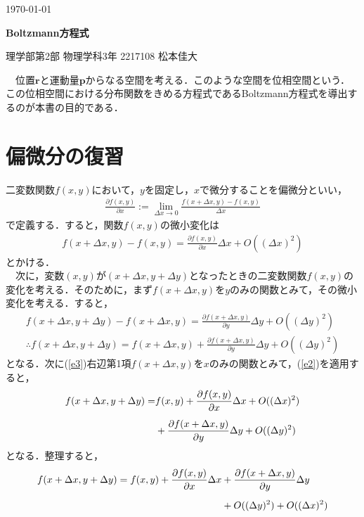 \documentclass[12pt]{jsarticle}\usepackage{ifthen}\newboolean{enlarge}\setboolean{enlarge}{false}
\newcommand{\vr}{{\bm{r}}} %
\newcommand{\vp}{{\bm{p}}} %
\begin{document}
\begin{flushright}
\footnotesize
\today
\end{flushright}
\noindent
{\bf
\Large Boltzmann方程式}
\begin{flushright}
理学部第2部 物理学科3年 2217108 松本佳大

\end{flushright}
　位置$\vr$と運動量$\vp$からなる空間を考える．このような空間を位相空間という．この位相空間における分布関数をきめる方程式であるBoltzmann方程式を導出するのが本書の目的である．






\section{偏微分の復習}
二変数関数$f(x,y)$において，$y$を固定し，$x$で微分することを偏微分といい，
\begin{align}
\label{e1}
\frac{\partial f(x,y)}{\partial x}:=\lim_{\Delta x\to 0}\frac{f(x+\Delta x,y)-f(x,y)}{\Delta x}
\end{align}
で定義する．すると，関数$f(x,y)$の微小変化は
\begin{align}
\label{e2}
f(x+\Delta x,y)-f(x,y)=\frac{\partial f(x,y)}{\partial x}\Delta x+O((\Delta x)^2)
\end{align}
とかける．\\
　次に，変数$(x,y)$が$(x+\Delta x,y+\Delta y)$となったときの二変数関数$f(x,y)$の変化を考える．そのために，まず$f(x+\Delta x,y)$を$y$のみの関数とみて，その微小変化を考える．すると，
\begin{align}
f(x+\Delta x,y+\Delta y)-f(x+\Delta x,y)=\frac{\partial f(x+\Delta x,y)}{\partial y}\Delta y+O((\Delta y)^2)\\[5pt]
\label{e3}
\therefore
f(x+\Delta x,y+\Delta y)=f(x+\Delta x,y)+\frac{\partial f(x+\Delta x,y)}{\partial y}\Delta y+O((\Delta y)^2)
\end{align}
となる．次に(\ref{e3})右辺第1項$f(x+\Delta x,y)$を$x$のみの関数とみて，(\ref{e2})を適用すると，
\begin{align}
f(x+\Delta x,y+\Delta y)
=&f(x,y)+\frac{\partial f(x,y)}{\partial x}\Delta x+O((\Delta x)^2)\notag\\[5pt]
&+\frac{\partial f(x+\Delta x,y)}{\partial y}\Delta y+O((\Delta y)^2)
\end{align}
となる．整理すると，
\begin{align}\label{e4}
f(x+\Delta x,y+\Delta y)
=f(x,y)+\frac{\partial f(x,y)}{\partial x}\Delta x&+\frac{\partial f(x+\Delta x,y)}{\partial y}\Delta y\notag\\[5pt]
&+O((\Delta y)^2)+O((\Delta x)^2)
\end{align}
\end{document}
